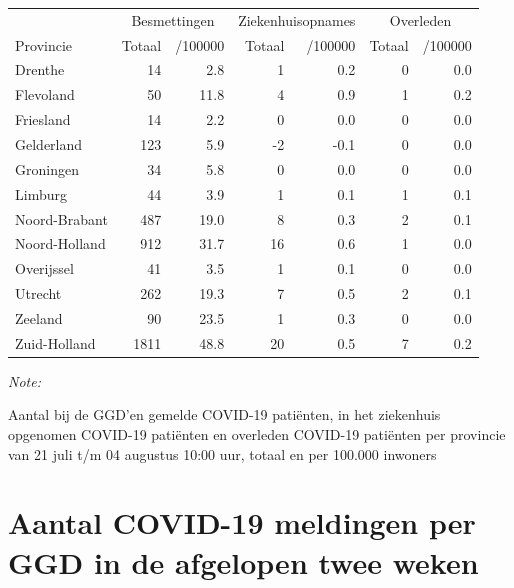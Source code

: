 \documentclass[
  english,
  man,floatsintext]{apa6}
\begin{document}
\begin{table}[H]
\centering
\begin{threeparttable}
\begin{tabular}{lrrrrrr}
\toprule
\multicolumn{1}{c}{ } & \multicolumn{2}{c}{Besmettingen} & \multicolumn{2}{c}{Ziekenhuisopnames} & \multicolumn{2}{c}{Overleden} \\
\cmidrule(l{3pt}r{3pt}){2-3} \cmidrule(l{3pt}r{3pt}){4-5} \cmidrule(l{3pt}r{3pt}){6-7}
Provincie & Totaal & /100000 & Totaal & /100000 & Totaal & /100000\\
\midrule
Drenthe & 14 & 2.8 & 1 & 0.2 & 0 & 0.0\\
Flevoland & 50 & 11.8 & 4 & 0.9 & 1 & 0.2\\
Friesland & 14 & 2.2 & 0 & 0.0 & 0 & 0.0\\
Gelderland & 123 & 5.9 & -2 & -0.1 & 0 & 0.0\\
Groningen & 34 & 5.8 & 0 & 0.0 & 0 & 0.0\\
Limburg & 44 & 3.9 & 1 & 0.1 & 1 & 0.1\\
Noord-Brabant & 487 & 19.0 & 8 & 0.3 & 2 & 0.1\\
Noord-Holland & 912 & 31.7 & 16 & 0.6 & 1 & 0.0\\
Overijssel & 41 & 3.5 & 1 & 0.1 & 0 & 0.0\\
Utrecht & 262 & 19.3 & 7 & 0.5 & 2 & 0.1\\
Zeeland & 90 & 23.5 & 1 & 0.3 & 0 & 0.0\\
Zuid-Holland & 1811 & 48.8 & 20 & 0.5 & 7 & 0.2\\
\bottomrule
\end{tabular}
\begin{tablenotes}
\item \textit{Note: } 
\item Aantal bij de GGD’en gemelde COVID-19 patiënten, in het ziekenhuis opgenomen COVID-19 patiënten en overleden COVID-19 patiënten per provincie van 21 juli t/m 04 augustus 10:00 uur, totaal en per 100.000 inwoners
\end{tablenotes}
\end{threeparttable}
\end{table}

\newpage

\hypertarget{aantal-covid-19-meldingen-per-ggd-in-de-afgelopen-twee-weken}{%
\section{Aantal COVID-19 meldingen per GGD in de afgelopen twee weken}\label{aantal-covid-19-meldingen-per-ggd-in-de-afgelopen-twee-weken}}
\end{document}
